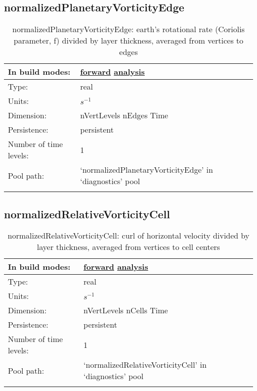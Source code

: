 \subsection[normalizedPlanetaryVorticityEdge]{normalizedPlanetaryVorticityEdge}
\label{subsec:var_sec_diagnostics_normalizedPlanetaryVorticityEdge}
\begin{center}
\begin{longtable}{| p{2.0in} | p{4.0in} |}
        \hline 
        In build modes: & \hyperref[subsec:forward_var_tab_diagnostics]{forward} \hyperref[subsec:analysis_var_tab_diagnostics]{analysis} \\
        \hline 
        Type: & real \\
        \hline 
        Units: & $s^{-1}$ \\
        \hline 
        Dimension: & nVertLevels nEdges Time \\
        \hline 
        Persistence: & persistent \\
        \hline 
        Number of time levels: & 1 \\
        \hline 
            Pool path: & `normalizedPlanetaryVorticityEdge' in `diagnostics' pool \\
		 \hline 
    \caption{normalizedPlanetaryVorticityEdge: earth's rotational rate (Coriolis parameter, f) divided by layer thickness, averaged from vertices to edges}
\end{longtable}
\end{center}
\subsection[normalizedRelativeVorticityCell]{normalizedRelativeVorticityCell}
\label{subsec:var_sec_diagnostics_normalizedRelativeVorticityCell}
\begin{center}
\begin{longtable}{| p{2.0in} | p{4.0in} |}
        \hline 
        In build modes: & \hyperref[subsec:forward_var_tab_diagnostics]{forward} \hyperref[subsec:analysis_var_tab_diagnostics]{analysis} \\
        \hline 
        Type: & real \\
        \hline 
        Units: & $s^{-1}$ \\
        \hline 
        Dimension: & nVertLevels nCells Time \\
        \hline 
        Persistence: & persistent \\
        \hline 
        Number of time levels: & 1 \\
        \hline 
            Pool path: & `normalizedRelativeVorticityCell' in `diagnostics' pool \\
		 \hline 
    \caption{normalizedRelativeVorticityCell: curl of horizontal velocity divided by layer thickness, averaged from vertices to cell centers}
\end{longtable}
\end{center}
